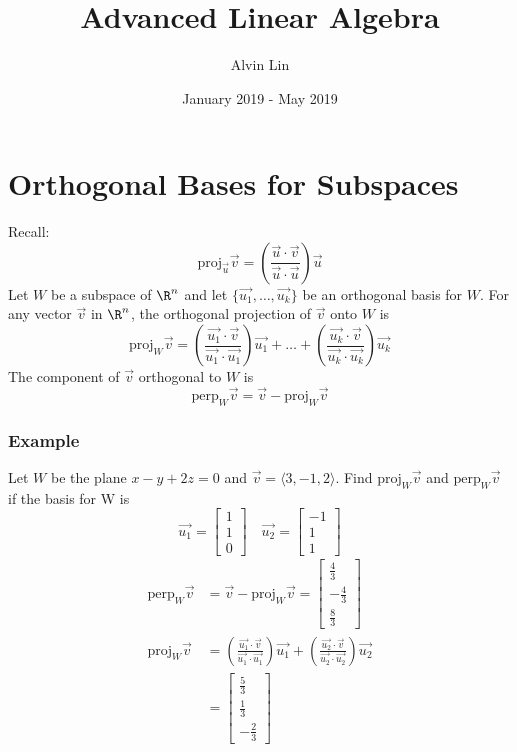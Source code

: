 \documentclass{math}
\title{Advanced Linear Algebra}
\author{Alvin Lin}
\date{January 2019 - May 2019}
\begin{document}
\maketitle

\section*{Orthogonal Bases for Subspaces}
Recall:
\[ \text{proj}_{\vec{u}}\vec{v} =
  \left(\frac{\vec{u}\cdot\vec{v}}{\vec{u}\cdot\vec{u}}\right)\vec{u} \]
Let \( W \) be a subspace of \( \R^n \) and let
\( \{\vec{u_1},\dots,\vec{u_k}\} \) be an orthogonal basis for \( W \). For any
vector \( \vec{v} \) in \( \R^n \), the orthogonal projection of \( \vec{v} \)
onto \( W \) is
\[ \text{proj}_{W}\vec{v} =
  \left(\frac{\vec{u_1}\cdot\vec{v}}{\vec{u_1}\cdot\vec{u_1}}\right)\vec{u_1}+
  \dots+
  \left(\frac{\vec{u_k}\cdot\vec{v}}{\vec{u_k}\cdot\vec{u_k}}\right)\vec{u_k} \]
The component of \( \vec{v} \) orthogonal to \( W \) is
\[ \text{perp}_{W}\vec{v} = \vec{v}-\text{proj}_{W}\vec{v} \]

\subsubsection*{Example}
Let \( W \) be the plane \( x-y+2z = 0 \) and \( \vec{v} = \langle3,-1,2\rangle
\). Find \( \text{proj}_{W}\vec{v} \) and \( \text{perp}_{W}\vec{v} \) if the
basis for W is
\[ \vec{u_1} = \begin{bmatrix}1 \\ 1 \\ 0\end{bmatrix} \quad
  \vec{u_2} = \begin{bmatrix}-1 \\ 1 \\ 1\end{bmatrix} \]
\begin{align*}
  \text{perp}_{W}\vec{v} &= \vec{v}-\text{proj}_{W}\vec{v} = \begin{bmatrix}
    \frac{4}{3} \\ -\frac{4}{3} \\ \frac{8}{3}\end{bmatrix} \\
  \text{proj}_{W}\vec{v} &=
    \left(\frac{\vec{u_1}\cdot\vec{v}}{\vec{u_1}\cdot\vec{u_1}}\right)\vec{u_1}+
    \left(\frac{\vec{u_2}\cdot\vec{v}}{\vec{u_2}\cdot\vec{u_2}}\right)\vec{u_2}
    \\
  &= \begin{bmatrix}
    \frac{5}{3} \\ \frac{1}{3} \\ -\frac{2}{3}
  \end{bmatrix}
\end{align*}
\end{document}
